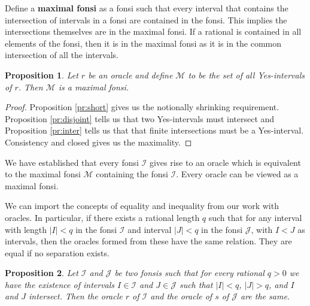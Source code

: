 \documentclass[12pt]{article}
\newtheorem{proposition}{Proposition}[subsection]
\theoremstyle{remark}
\begin{document}
Define a \textbf{maximal fonsi} as a fonsi such that every interval that contains the intersection of intervals in a fonsi are contained in the fonsi. This implies the intersections themselves are in the maximal fonsi. If a rational is contained in all elements of the fonsi, then it is in the maximal fonsi as it is in the common intersection of all the intervals. 

\begin{proposition} Let $r$ be an oracle and define $\mathcal{M}$ to be the set of all Yes-intervals of $r$. Then $\mathcal{M}$ is a maximal fonsi. 
\end{proposition}

\begin{proof}
     Proposition \ref{pr:short} gives us the notionally shrinking requirement. Proposition \ref{pr:disjoint} tells us that two Yes-intervals must intersect and Proposition \ref{pr:inter} tells us that that finite intersections must be a Yes-interval. Consistency and closed gives us the maximality.
\end{proof}

We have established that every fonsi $\mathcal{I}$ gives rise to an oracle which is equivalent to the maximal fonsi $\mathcal{M}$ containing the fonsi $\mathcal{I}$. Every oracle can be viewed as a maximal fonsi.

We can import the concepts of equality and inequality from our work with oracles. In particular, if there exists a rational length $q$ such that for any interval with length $|I|<q$ in the fonsi $\mathcal{I}$ and interval $|J|<q$ in the fonsi $\mathcal{J}$, with $I  < J$ as intervals, then the oracles formed from these have the same relation. They are equal if no separation exists. 

\begin{proposition}\label{pr:fonsi-inter}
Let $\mathcal{I}$ and $\mathcal{J}$ be two fonsis such that for every rational $q>0$ we have the existence of intervals $I \in \mathcal{I}$ and $J \in \mathcal{J}$ such that $|I| <q$, $|J|>q$, and $I$ and $J$ intersect. Then the oracle $r$ of $\mathcal{I}$ and the oracle of $s$ of $\mathcal{J}$ are the same. 
\end{proposition}
\end{document}
